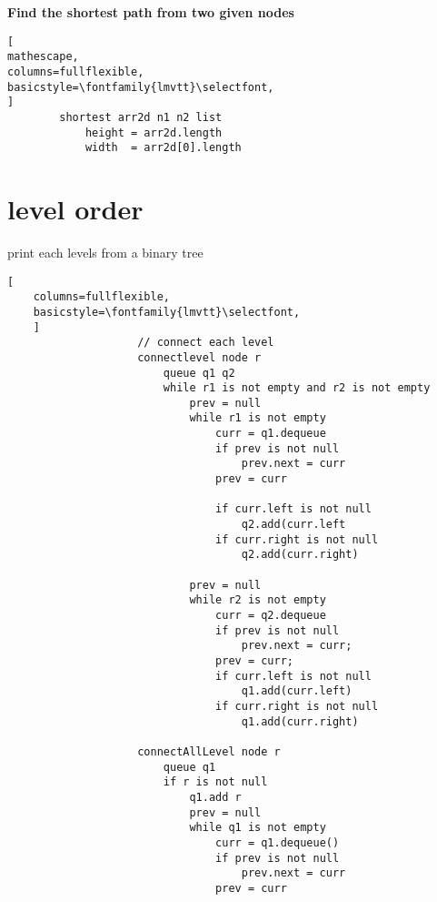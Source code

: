 \documentclass{article}
\begin{document}
\textbf{Find the shortest path from two given nodes} \\
\begin{lstlisting}[
mathescape,
columns=fullflexible,
basicstyle=\fontfamily{lmvtt}\selectfont,
]
        shortest arr2d n1 n2 list
            height = arr2d.length
            width  = arr2d[0].length
\end{lstlisting} 


\section{level order}
print each levels from a binary tree 
\begin{lstlisting}[
    columns=fullflexible,
    basicstyle=\fontfamily{lmvtt}\selectfont,
    ]
                    // connect each level 
                    connectlevel node r
                        queue q1 q2 
                        while r1 is not empty and r2 is not empty
                            prev = null
                            while r1 is not empty
                                curr = q1.dequeue
                                if prev is not null
                                    prev.next = curr
                                prev = curr

                                if curr.left is not null
                                    q2.add(curr.left
                                if curr.right is not null
                                    q2.add(curr.right)

                            prev = null
                            while r2 is not empty
                                curr = q2.dequeue
                                if prev is not null
                                    prev.next = curr;
                                prev = curr;
                                if curr.left is not null
                                    q1.add(curr.left)
                                if curr.right is not null
                                    q1.add(curr.right)

                    connectAllLevel node r
                        queue q1
                        if r is not null
                            q1.add r
                            prev = null
                            while q1 is not empty
                                curr = q1.dequeue()
                                if prev is not null
                                    prev.next = curr
                                prev = curr


\end{lstlisting}
\end{document}
